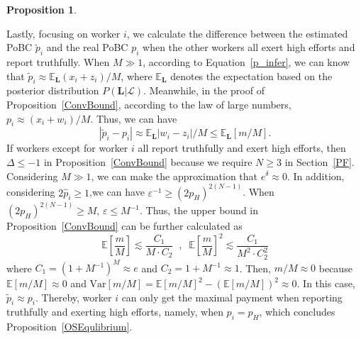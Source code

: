 \documentclass{article}
\makeatletter
\newtheorem{proposition}[theorem]{Proposition}
\renewenvironment{proof}[1][\proofname]{\par
  \vspace{-\topsep}%
  \pushQED{\qed}%
  \normalfont
  \topsep0pt \partopsep0pt %
  \trivlist
  \item[\hskip\labelsep
        \itshape
    #1\@addpunct{.}]\ignorespaces
}{%
  \popQED\endtrivlist\@endpefalse
  \addvspace{0pt plus 0pt} %
}
\makeatother
\begin{document}
\begin{proposition}
\begin{proof}
%
\end{proof}
\end{proposition}
Lastly, focusing on worker $i$, we calculate the difference between the estimated PoBC $\tilde{p}_i$ and the real PoBC $p_i$ when the other workers all exert high efforts and report truthfully.
When $M\gg 1$, according to Equation~\ref{p_infer}, we can know that $\tilde{p}_i\approx \mathbb{E}_{\bm{L}}(x_i+z_i)/M$, where $\mathbb{E}_{\bm{L}}$ denotes the expectation based on the posterior distribution $P(\bm{L}|\mathcal{L})$. Meanwhile, in the proof of Proposition~\ref{ConvBound}, according to the law of large numbers, $p_i\approx (x_i+w_i)/M$. Thus, we can have
\begin{equation}
|\tilde{p}_i-p_i|\approx \mathbb{E}_{\bm{L}}|w_i-z_i|/M\leq \mathbb{E}_{\bm{L}}\left[m/M\right].
\end{equation}
If workers except for worker $i$ all report truthfully and exert high efforts, then $\Delta \leq -1$ in Proposition~\ref{ConvBound} because we require $N\geq 3$ in Section~\ref{PF}.
Considering $M\gg 1$, we can make the approximation that $e^{\delta}\approx 0$.
In addition, considering $2\hat{p}_i\geq 1$,we can have $\varepsilon^{-1}\geq (2p_H)^{2(N-1)}$.
When $(2p_H)^{2(N-1)} \geq M$, $\varepsilon\leq M^{-1}$.
Thus, the upper bound in Proposition~\ref{ConvBound} can be further calculated as
\begin{equation}
\mathbb{E}\left[\frac{m}{M}\right]\lesssim \frac{C_{1}}{M\cdot C_2}\;\;, \;\;\mathbb{E}\left[\frac{m}{M}\right]^2\lesssim \frac{C_{1}}{M^2\cdot C_2^2}
\end{equation}
where $C_{1}=(1+M^{-1})^{M}\approx e$ and $C_{2}=1+M^{-1}\approx 1$.
Then, $m/M\approx 0$ because $\mathbb{E}[m/M]\approx 0$ and $\mathrm{Var}[m/M]=\mathbb{E}[m/M]^2-(\mathbb{E}[m/M])^2 \approx 0$.
In this case, $\tilde{p}_i\approx p_i$.
Thereby, worker $i$ can only get the maximal payment when reporting truthfully and exerting high efforts, namely, when $p_i=p_H$, which concludes Proposition~\ref{OSEqulibrium}.
\end{document}
